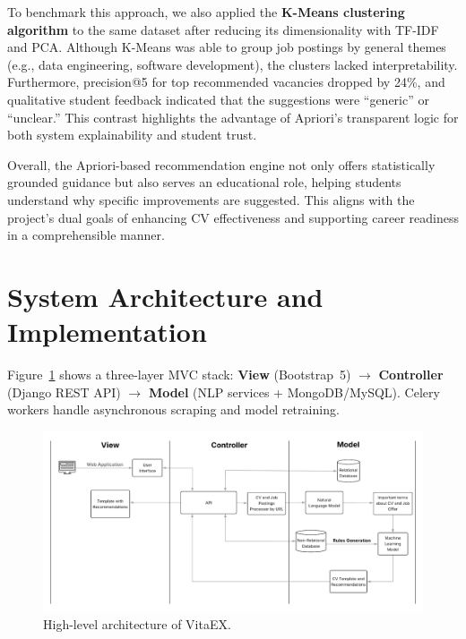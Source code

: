 \documentclass[runningheads]{llncs}
\begin{document}
	To benchmark this approach, we also applied the \textbf{K-Means clustering algorithm} to the same dataset after reducing its dimensionality with TF-IDF and PCA. Although K-Means was able to group job postings by general themes (e.g., data engineering, software development), the clusters lacked interpretability. Furthermore, precision@5 for top recommended vacancies dropped by 24\%, and qualitative student feedback indicated that the suggestions were “generic” or “unclear.” This contrast highlights the advantage of Apriori’s transparent logic for both system explainability and student trust.
	
	Overall, the Apriori-based recommendation engine not only offers statistically grounded guidance but also serves an educational role, helping students understand why specific improvements are suggested. This aligns with the project’s dual goals of enhancing CV effectiveness and supporting career readiness in a comprehensible manner.
	

	\section{System Architecture and Implementation}
	
	Figure~\ref{fig:blocks} shows a three-layer MVC stack: \textbf{View} (Bootstrap~5) $\rightarrow$ \textbf{Controller} (Django REST API) $\rightarrow$ \textbf{Model} (NLP services + MongoDB/MySQL). Celery workers handle asynchronous scraping and model retraining.
	
	\begin{figure}[H]
		\centering
		\includegraphics[width=1\linewidth]{imagenes/Arquitectura_Sistema.png}
		\caption{High-level architecture of VitaEX.}
		\label{fig:blocks}
	\end{figure}
	
\end{document}
